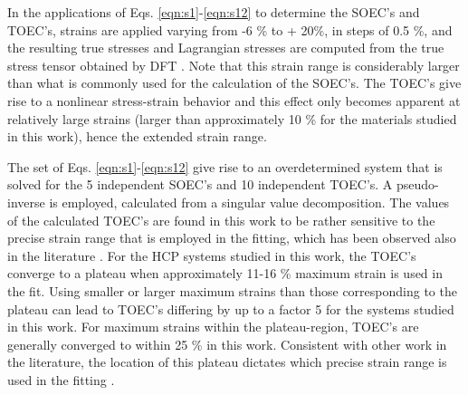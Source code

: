 \documentclass[showpacs,aps,floatfix,prb,reprint,superscriptaddress]{revtex4-1}
\begin{document}
In the applications of Eqs. \ref{eqn:s1}-\ref{eqn:s12} to determine the SOEC's and TOEC's, strains are applied varying from -6 \% to + 20\%, in steps of 0.5 \%, and the resulting true stresses and Lagrangian stresses are computed from the true stress tensor obtained by DFT \cite{lopuszynski2007ab}.
Note that this strain range is considerably larger than what is commonly used for the calculation of the SOEC's. The TOEC's give rise to a nonlinear stress-strain behavior and this effect only becomes apparent at relatively large strains (larger than approximately 10 \% for the materials studied in this work), hence the extended strain range.

The set of Eqs. \ref{eqn:s1}-\ref{eqn:s12} give rise to an overdetermined system that is solved for the 5 independent SOEC's and 10 independent TOEC's. A pseudo-inverse is employed, calculated from a singular value decomposition. The values of the calculated TOEC's are found in this work to be rather sensitive to the precise strain range that is employed in the fitting, which has been observed also in the literature \cite{wang2009ab,lopuszynski2007ab,wang2012nonlinear}. For the HCP systems studied in this work, the TOEC's converge to a plateau when approximately 11-16 \% maximum strain is used in the fit. Using smaller or larger maximum strains than those corresponding to the plateau can lead to TOEC's differing by up to a factor 5 for the systems studied in this work. For maximum strains within the plateau-region, TOEC's are generally converged to within 25 \% in this work. Consistent with other work in the literature, the location of this plateau dictates which precise strain range is used in the fitting \cite{wang2009ab,wang2012nonlinear}.
\end{document}
